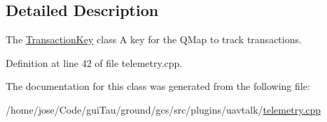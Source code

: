 \subsection{Detailed Description}
The \hyperlink{class_transaction_key}{Transaction\-Key} class A key for the Q\-Map to track transactions. 

Definition at line 42 of file telemetry.\-cpp.



The documentation for this class was generated from the following file\-:\begin{DoxyCompactItemize}
\item 
/home/jose/\-Code/gui\-Tau/ground/gcs/src/plugins/uavtalk/\hyperlink{telemetry_8cpp}{telemetry.\-cpp}\end{DoxyCompactItemize}
